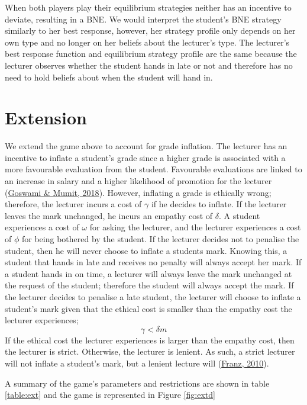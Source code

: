 \documentclass[11pt,preprint, authoryear]{elsarticle}
\numberwithin{equation}{section}
\numberwithin{figure}{section}
\numberwithin{table}{section}
\begin{document}
When both players play their equilibrium strategies neither has an
incentive to deviate, resulting in a BNE. We would interpret the
student's BNE strategy similarly to her best response, however, her
strategy profile only depends on her own type and no longer on her
beliefs about the lecturer's type. The lecturer's best response function
and equilibrium strategy profile are the same because the lecturer
observes whether the student hands in late or not and therefore has no
need to hold beliefs about when the student will hand in.

\hypertarget{extension}{%
\section{\texorpdfstring{Extension
\label{extension}}{Extension }}\label{extension}}

We extend the game above to account for grade inflation. The lecturer
has an incentive to inflate a student's grade since a higher grade is
associated with a more favourable evaluation from the student.
Favourable evaluations are linked to an increase in salary and a higher
likelihood of promotion for the lecturer
(\protect\hyperlink{ref-2018grades}{Goswami \& Mumit, 2018}). However,
inflating a grade is ethically wrong; therefore, the lecturer incurs a
cost of \(\gamma\) if he decides to inflate. If the lecturer leaves the
mark unchanged, he incurs an empathy cost of \(\delta\). A student
experiences a cost of \(\omega\) for asking the lecturer, and the
lecturer experiences a cost of \(\phi\) for being bothered by the
student. If the lecturer decides not to penalise the student, then he
will never choose to inflate a students mark. Knowing this, a student
that hands in late and receives no penalty will always accept her mark.
If a student hands in on time, a lecturer will always leave the mark
unchanged at the request of the student; therefore the student will
always accept the mark. If the lecturer decides to penalise a late
student, the lecturer will choose to inflate a student's mark given that
the ethical cost is smaller than the empathy cost the lecturer
experiences;\\
\[\gamma < \delta m \] If the ethical cost the lecturer experiences is
larger than the empathy cost, then the lecturer is strict. Otherwise,
the lecturer is lenient. As such, a strict lecturer will not inflate a
student's mark, but a lenient lecture will
(\protect\hyperlink{ref-2010grade}{Franz, 2010}).

A summary of the game's parameters and restrictions are shown in table
\ref{table:ext} and the game is represented in Figure \ref{fig:extd}
\end{document}
